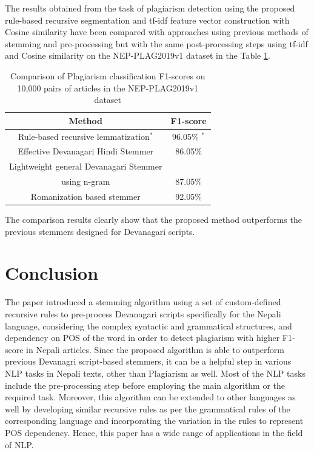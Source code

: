 \documentclass[conference]{IEEEtran}
\begin{document}
The results obtained from the task of plagiarism detection using the proposed 
rule-based recursive segmentation and tf-idf feature vector construction with
Cosine similarity have been compared with approaches using
previous methods of stemming and pre-processing but with the same
post-processing steps using tf-idf and Cosine similarity on the NEP-PLAG2019v1 dataset 
in the Table \ref{comparison}.

\begin{table}[htbp]
\caption{Comparison of Plagiarism classification F1-scores on 10,000 pairs of
articles in the NEP-PLAG2019v1 dataset}
\begin{center}
\begin{tabular}{|c|c|}
\hline
\textbf{Method} & {\textbf{F1-score}} \\
\hline
Rule-based recursive lemmatization$^*$ & 96.05\% $^*$\\
\hline
Effective Devanagari Hindi Stemmer \cite{abhishek_effective_2013} & 86.05\% \\
\hline
Lightweight general Devanagari Stemmer\\ using n-gram \cite{dangui_lightweight_2015} & 87.05\% \\
\hline
Romanization based stemmer \cite{pande_devanagari_nodate}& 92.05\% \\
\hline
\end{tabular}
\label{comparison}
\end{center}
\end{table}

The comparison results clearly show that the proposed method outperforms the
previous stemmers designed for Devanagari scripts.

\section{Conclusion}

The paper introduced a stemming algorithm using a set of custom-defined
recursive rules to pre-process Devanagari
scripts specifically for the Nepali language, considering the complex syntactic
and grammatical structures, and dependency on POS of the word in order to 
detect plagiarism with higher F1-score in Nepali articles. Since the proposed
algorithm is able to outperform previous Devanagri script-based stemmers, 
it can be a helpful step in various NLP tasks in Nepali texts, other than Plagiarism as
well. Most of the NLP tasks include the pre-processing step before 
employing the main algorithm or the
required task. Moreover, this algorithm can be extended to other languages as
well by developing similar recursive rules as per the grammatical rules of the
corresponding language and incorporating the variation in the rules to
represent POS dependency. Hence, this paper has a wide range of applications in
the field of NLP. 
\end{document}
